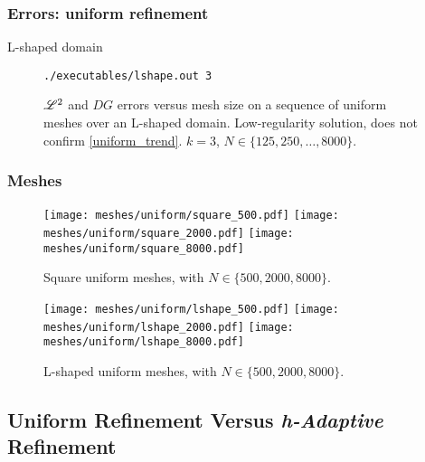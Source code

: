 \begin{frame}[fragile]
    \frametitle{Errors: uniform refinement}

    \begin{description}
        \item[L-shaped domain] \lstinline{./executables/lshape.out 3}
    \end{description}    

    \begin{figure}[!ht]
        
        \caption{$\mathscr{L}^2$ and $DG$ errors versus mesh size on a sequence of uniform meshes over an L-shaped domain. Low-regularity solution, does not confirm \eqref{uniform_trend}. $k = 3$, $N \in \{125, 250, \dots, 8000\}$.}
    \end{figure}
\end{frame}

\begin{frame}
    \frametitle{Meshes}

    \begin{figure}[!ht]
        \centering
        \texttt{[image: meshes/uniform/square\_500.pdf]}
        \texttt{[image: meshes/uniform/square\_2000.pdf]}
        \texttt{[image: meshes/uniform/square\_8000.pdf]}
        \caption{Square uniform meshes, with $N \in \{500, 2000, 8000\}$.}
    \end{figure}

    \begin{figure}[!ht]
        \centering
        \texttt{[image: meshes/uniform/lshape\_500.pdf]}
        \texttt{[image: meshes/uniform/lshape\_2000.pdf]}
        \texttt{[image: meshes/uniform/lshape\_8000.pdf]}
        \caption{L-shaped uniform meshes, with $N \in \{500, 2000, 8000\}$.}
    \end{figure}
\end{frame}

\subsection{Uniform Refinement Versus \textit{h-Adaptive} Refinement}

